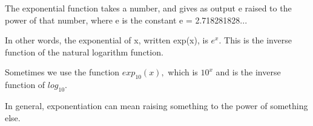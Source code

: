 The exponential function takes a number, and gives as output
e raised to the power of that number, where e is the constant
e = 2.718281828...\par

In other words, the exponential of x, written exp(x), is $e^{x}.$ 
This is the inverse function of the natural logarithm function.
\par
Sometimes we use the function $exp_{10}(x),$  which is $10^{x}$ 
and is the inverse function of $log_{10}.$ 
\par
In general, exponentiation can mean raising something to the power of something else.